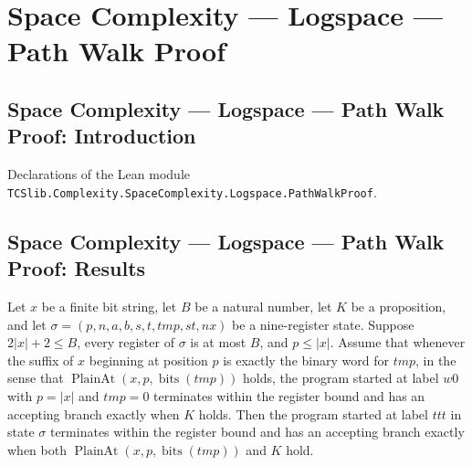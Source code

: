 \section{Space Complexity --- Logspace --- Path Walk Proof}
\subsection*{Space Complexity --- Logspace --- Path Walk Proof: Introduction}

Declarations of the Lean module \texttt{TCSlib.Complexity.SpaceComplexity.Logspace.PathWalkProof}.

\subsection*{Space Complexity --- Logspace --- Path Walk Proof: Results}

\begin{lemma}
\label{Complexity.LogProg.ps_tcmp}
\leanok
{}
Let $x$ be a finite bit string, let $B$ be a natural number, let $K$ be a proposition,
and let $\sigma=(p,n,a,b,s,t,tmp,st,nx)$ be a nine-register state. Suppose $2|x|+2\le
B$, every register of $\sigma$ is at most $B$, and $p\le |x|$. Assume that whenever the
suffix of $x$ beginning at position $p$ is exactly the binary word for $tmp$, in the
sense that $\operatorname{PlainAt}(x,p,\operatorname{bits}(tmp))$ holds, the program
started at label $w0$ with $p=|x|$ and $tmp=0$ terminates within the register bound and
has an accepting branch exactly when $K$ holds. Then the program started at label $ttt$
in state $\sigma$ terminates within the register bound and has an accepting branch
exactly when both $\operatorname{PlainAt}(x,p,\operatorname{bits}(tmp))$ and $K$ hold.
\end{lemma}

